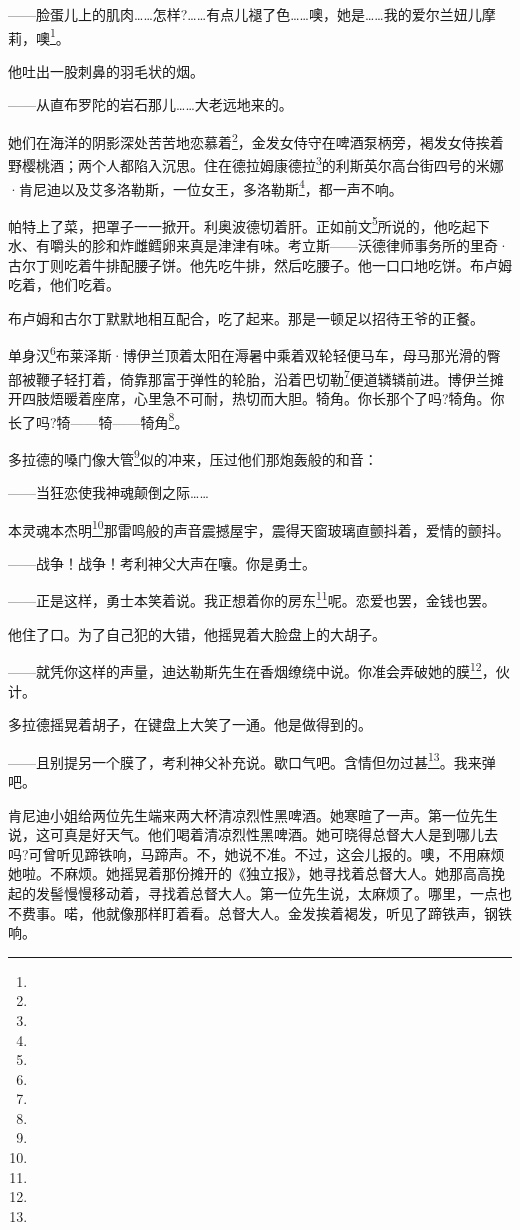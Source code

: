 \par ——脸蛋儿上的肌肉……怎样?……有点儿褪了色……噢，她是……我的爱尔兰妞儿摩莉，噢\footnote{}。
\par 他吐出一股刺鼻的羽毛状的烟。
\par ——从直布罗陀的岩石那儿……大老远地来的。
\par 她们在海洋的阴影深处苦苦地恋慕着\footnote{}，金发女侍守在啤酒泵柄旁，褐发女侍挨着野樱桃酒；两个人都陷入沉思。住在德拉姆康德拉\footnote{}的利斯英尔高台街四号的米娜·肯尼迪以及艾多洛勒斯，一位女王，多洛勒斯\footnote{}，都一声不响。
\par 帕特上了菜，把罩子一一掀开。利奥波德切着肝。正如前文\footnote{}所说的，他吃起下水、有嚼头的胗和炸雌鳕卵来真是津津有味。考立斯——沃德律师事务所的里奇·古尔丁则吃着牛排配腰子饼。他先吃牛排，然后吃腰子。他一口口地吃饼。布卢姆吃着，他们吃着。
\par 布卢姆和古尔丁默默地相互配合，吃了起来。那是一顿足以招待王爷的正餐。
\par 单身汉\footnote{}布莱泽斯·博伊兰顶着太阳在溽暑中乘着双轮轻便马车，母马那光滑的臀部被鞭子轻打着，倚靠那富于弹性的轮胎，沿着巴切勒\footnote{}便道辚辚前进。博伊兰摊开四肢焐暖着座席，心里急不可耐，热切而大胆。犄角。你长那个了吗?犄角。你长了吗?犄——犄——犄角\footnote{}。
\par 多拉德的嗓门像大管\footnote{}似的冲来，压过他们那炮轰般的和音：
\par ——当狂恋使我神魂颠倒之际……
\par 本灵魂本杰明\footnote{}那雷鸣般的声音震撼屋宇，震得天窗玻璃直颤抖着，爱情的颤抖。
\par ——战争！战争！考利神父大声在嚷。你是勇士。
\par ——正是这样，勇士本笑着说。我正想着你的房东\footnote{}呢。恋爱也罢，金钱也罢。
\par 他住了口。为了自己犯的大错，他摇晃着大脸盘上的大胡子。
\par ——就凭你这样的声量，迪达勒斯先生在香烟缭绕中说。你准会弄破她的膜\footnote{}，伙计。
\par 多拉德摇晃着胡子，在键盘上大笑了一通。他是做得到的。
\par ——且别提另一个膜了，考利神父补充说。歇口气吧。含情但勿过甚\footnote{}。我来弹吧。
\par 肯尼迪小姐给两位先生端来两大杯清凉烈性黑啤酒。她寒暄了一声。第一位先生说，这可真是好天气。他们喝着清凉烈性黑啤酒。她可晓得总督大人是到哪儿去吗?可曾听见蹄铁响，马蹄声。不，她说不准。不过，这会儿报的。噢，不用麻烦她啦。不麻烦。她摇晃着那份摊开的《独立报》，她寻找着总督大人。她那高高挽起的发髻慢慢移动着，寻找着总督大人。第一位先生说，太麻烦了。哪里，一点也不费事。喏，他就像那样盯着看。总督大人。金发挨着褐发，听见了蹄铁声，钢铁响。
